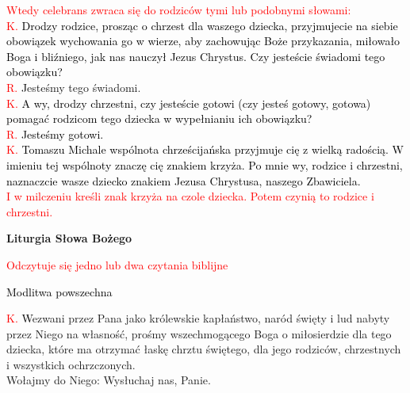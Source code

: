 \documentclass[10pt, a5paper]{extarticle}
\begin{document}
\noindent\textcolor{red} {Wtedy celebrans zwraca się do rodziców tymi lub podobnymi słowami:} \\
\textcolor{red}{K.} \textcolor{black} {Drodzy rodzice, prosząc o chrzest dla waszego dziecka, przyjmujecie na siebie obowiązek wychowania go w wierze, aby zachowując Boże przykazania, miłowało Boga i bliźniego, jak nas nauczył Jezus Chrystus. Czy jesteście świadomi tego obowiązku?} \\
\textcolor{red}{R.} \textcolor{black} Jesteśmy tego świadomi.\\
\textcolor{red}{K.} \textcolor{black}{A wy, drodzy chrzestni, czy jesteście gotowi (czy jesteś gotowy, gotowa) pomagać rodzicom tego dziecka w wypełnianiu ich obowiązku?}\\
\textcolor{red}{R.} \textcolor{black}{Jesteśmy gotowi.} \\
\textcolor{red}{K.} \textcolor{black}{Tomaszu Michale wspólnota chrześcijańska przyjmuje cię z wielką radością. W imieniu tej wspólnoty znaczę cię znakiem krzyża. Po mnie wy, rodzice i chrzestni, naznaczcie wasze dziecko znakiem Jezusa Chrystusa, naszego Zbawiciela.}\\
\indent\textcolor{red}{I w milczeniu kreśli znak krzyża na czole dziecka. Potem czynią to rodzice i chrzestni.}
\begin{center}
\Large
\textbf{Liturgia Słowa Bożego} \\

\normalsize
\end{center}
\textcolor{red}{Odczytuje się jedno lub dwa czytania biblijne}
\begin{center}
\Large
\noindent\textcolor{black}{Modlitwa powszechna}
\end{center}
\textcolor{red}{K.} \textcolor{black}Wezwani przez Pana jako królewskie kapłaństwo, naród święty i lud nabyty przez Niego na własność, prośmy wszechmogącego Boga o miłosierdzie dla tego dziecka, które ma otrzymać łaskę chrztu świętego, dla jego rodziców, chrzestnych i wszystkich ochrzczonych. \\
Wołajmy do Niego: Wysłuchaj nas, Panie.
\end{document}
